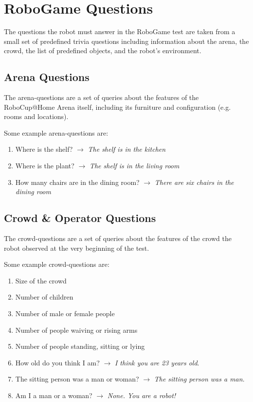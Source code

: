 \chapter{RoboGame Questions}
\label{chap:robogame-appendix}

The questions the robot must answer in the RoboGame test are taken from a small set of predefined trivia questions including information about the arena, the crowd, the list of predefined objects, and the robot's environment.

\section{Arena Questions}
The arena-questions are a set of queries about the features of the RoboCup@Home Arena itself, including its furniture and configuration (e.g. rooms and locations).

Some example arena-questions are:
\begin{enumerate}
    \item Where is the shelf? $\rightarrow$ \textit{The shelf is in the kitchen}
    \item Where is the plant? $\rightarrow$ \textit{The shelf is in the living room}
    \item How many chairs are in the dining room? $\rightarrow$ \textit{There are six chairs in the dining room}
\end{enumerate}

\section{Crowd \& Operator Questions}
The crowd-questions are a set of queries about the features of the crowd the robot observed at the very beginning of the test.

Some example crowd-questions are:
\begin{enumerate}
    \item Size of the crowd
    \item Number of children
    \item Number of male or female people
    \item Number of people waiving or rising arms
    \item Number of people standing, sitting or lying
    \item How old do you think I am? $\rightarrow$ \textit{I think you are 23 years old}.
    \item The sitting person was a man or woman? $\rightarrow$ \textit{The sitting person was a man}.
    \item Am I a man or a woman? $\rightarrow$ \textit{None. You are a robot!}
\end{enumerate}

